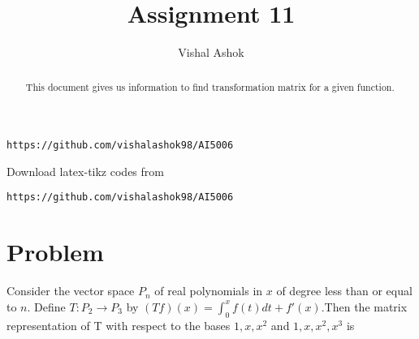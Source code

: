 \documentclass[journal,12pt,twocolumn]{IEEEtran}
\begin{document}
\makeatletter
{}
\makeatother
\let\StandardTheFigure\thefigure
\let\vec\mathbf
\renewcommand{\thefigure}{\theproblem}
\def\putbox#1#2#3{\makebox[0in][l]{\makebox[#1][l]{}\raisebox{\baselineskip}[0in][0in]{\raisebox{#2}[0in][0in]{#3}}}}
     \def\rightbox#1{\makebox[0in][r]{#1}}
     \def\centbox#1{\makebox[0in]{#1}}
     \def\topbox#1{\raisebox{-\baselineskip}[0in][0in]{#1}}
     \def\midbox#1{\raisebox{-0.5\baselineskip}[0in][0in]{#1}}
\vspace{3cm}
\title{Assignment 11}
\author{Vishal Ashok}
\maketitle
\newpage
\bigskip
\renewcommand{\thefigure}{\theenumi}
\renewcommand{\thetable}{\theenumi}
\begin{abstract}
This document gives us information to find transformation matrix for a given function.
\end{abstract}

%
\begin{lstlisting}
https://github.com/vishalashok98/AI5006\end{lstlisting}
%
Download latex-tikz codes from 
%
\begin{lstlisting}
https://github.com/vishalashok98/AI5006\end{lstlisting}
%
\section{Problem}
Consider the vector space $P_n$ of real polynomials in $x$ of degree less than or equal to $n$. Define $T:P_2 \rightarrow P_3$ by $(Tf)(x)=\int_{0}^{x}f(t)dt+f'(x)$.Then the matrix representation of T with respect to the bases ${1,x,x^2}$ and ${1,x,x^2,x^3}$ is
\end{document}
